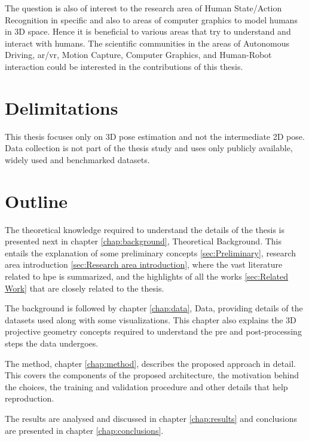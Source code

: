 The question is also of interest to the research area of Human State/Action Recognition in specific and also to areas of computer graphics to model humans in 3D space. Hence it is beneficial to various areas that try to understand and interact with humans. The scientific communities in the areas of Autonomous Driving, \ac{ar/vr}, Motion Capture, Computer Graphics, and Human-Robot interaction could be interested in the contributions of this thesis.

\section{Delimitations}
\label{sec:delimitations}
This thesis focuses only on 3D pose estimation and not the intermediate 2D pose. Data collection is not part of the thesis study and uses only publicly available, widely used and benchmarked datasets.

\section{Outline}
\label{sec:outline}
The theoretical knowledge required to understand the details of the thesis is presented next in chapter \ref{chap:background}, Theoretical Background. This entails the explanation of some preliminary concepts \ref{sec:Preliminary}, research area introduction \ref{sec:Research area introduction}, where the vast literature related to \ac{hpe} is summarized, and the highlights of all the works \ref{sec:Related Work} that are closely related to the thesis.

The background is followed by chapter \ref{chap:data}, Data,  providing details of the datasets used along with some visualizations. This chapter also explains the 3D projective geometry concepts required to understand the pre and post-processing steps the data undergoes.

The method, chapter \ref{chap:method}, describes the proposed approach in detail. This covers the components of the proposed architecture, the motivation behind the choices, the training and validation procedure and other details that help reproduction.

The results are analysed and discussed in chapter \ref{chap:results} and conclusions are presented in chapter \ref{chap:conclusions}.


